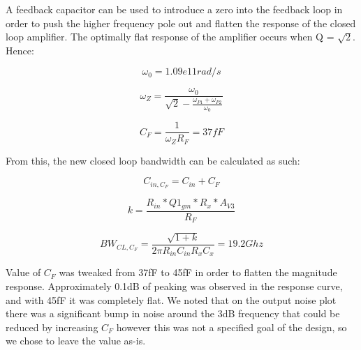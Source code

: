 \documentclass[12pt,a4paper]{article}
\begin{document}

A feedback capacitor can be used to introduce a zero into the feedback loop in
order to push the higher frequency pole out and flatten the response of the
closed loop amplifier. The optimally flat response of the amplifier occurs when Q = $\sqrt{2}$. Hence:

\begin{equation}
  \omega_0 = 1.09e11 rad/s
\end{equation}

\begin{equation}
  \omega_Z = \frac{\omega_{0}}{\sqrt{2} - \frac{\omega_{P1} + \omega_{P2}}{\omega_{0}}}
\end{equation}

\begin{equation}
  C_F = \frac{1}{\omega_Z R_F} = 37fF
\end{equation}

From this, the new closed loop bandwidth can be calculated as such:

\begin{equation}
  C_{in,C_F} = C_{in} + C_F
\end{equation}

\begin{equation}
  k = \frac{R_{in} * Q1_{gm} * R_x * A_{V3}}{R_F}
\end{equation}

\begin{equation}
  BW_{CL,C_F} = \frac{\sqrt{1 + k}}{2 \pi R_{in} C_{in} R_x C_x} = 19.2Ghz
\end{equation}

Value of $C_F$ was tweaked from 37fF to 45fF in order to flatten the magnitude response. Approximately 0.1dB of peaking was observed in the response curve, and with 45fF it was completely flat. We noted that on the output noise plot there was a significant bump in noise around the 3dB frequency that could be reduced by increasing $C_F$ however this was not a specified goal of the design, so we chose to leave the value as-is.
\pagebreak



\end{document}
